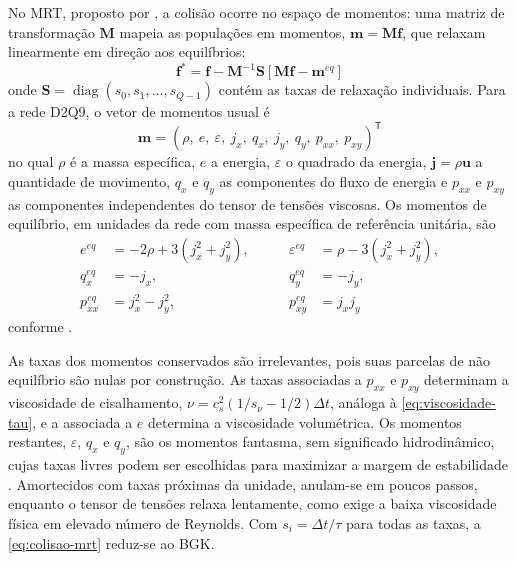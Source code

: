 No MRT, proposto por \textcite{dHumieres1992}, a colisão ocorre no espaço de momentos: uma matriz de transformação $\mathbf{M}$ mapeia as populações em momentos, $\mathbf{m} = \mathbf{M}\mathbf{f}$, que relaxam linearmente em direção aos equilíbrios:
\begin{equation}\label{eq:colisao-mrt}
    \mathbf{f}^* = \mathbf{f} - \mathbf{M}^{-1}\mathbf{S}[\mathbf{M}\mathbf{f} - \mathbf{m}^{eq}]
\end{equation}
onde $\mathbf{S} = \operatorname{diag}(s_0, s_1, \ldots, s_{Q-1})$ contém as taxas de relaxação individuais.
Para a rede D2Q9, o vetor de momentos usual é
\begin{equation}\label{eq:momentos-d2q9}
    \mathbf{m} = \left( \rho,\ e,\ \varepsilon,\ j_x,\ q_x,\ j_y,\ q_y,\ p_{xx},\ p_{xy} \right)^{\mathsf{T}}
\end{equation}
no qual $\rho$ é a massa específica, $e$ a energia, $\varepsilon$ o quadrado da energia, $\mathbf{j} = \rho \mathbf{u}$ a quantidade de movimento, $q_x$ e $q_y$ as componentes do fluxo de energia e $p_{xx}$ e $p_{xy}$ as componentes independentes do tensor de tensões viscosas.
Os momentos de equilíbrio, em unidades da rede com massa específica de referência unitária, são
\begin{equation}\label{eq:momentos-equilibrio-d2q9}
    \begin{aligned}
        e^{eq} &= -2\rho + 3 \left( j_x^2 + j_y^2 \right), &\qquad \varepsilon^{eq} &= \rho - 3 \left( j_x^2 + j_y^2 \right), \\
        q_x^{eq} &= -j_x, &\qquad q_y^{eq} &= -j_y, \\
        p_{xx}^{eq} &= j_x^2 - j_y^2, &\qquad p_{xy}^{eq} &= j_x j_y
    \end{aligned}
\end{equation}
conforme \textcite{Lallemand2000}.

As taxas dos momentos conservados são irrelevantes, pois suas parcelas de não equilíbrio são nulas por construção.
As taxas associadas a $p_{xx}$ e $p_{xy}$ determinam a viscosidade de cisalhamento, $\nu = c_s^2 (1/s_\nu - 1/2) \Delta t$, análoga à \eqref{eq:viscosidade-tau}, e a associada a $e$ determina a viscosidade volumétrica.
Os momentos restantes, $\varepsilon$, $q_x$ e $q_y$, são os momentos fantasma, sem significado hidrodinâmico, cujas taxas livres podem ser escolhidas para maximizar a margem de estabilidade \parencite{Lallemand2000}.
Amortecidos com taxas próximas da unidade, anulam-se em poucos passos, enquanto o tensor de tensões relaxa lentamente, como exige a baixa viscosidade física em elevado número de Reynolds.
Com $s_i = \Delta t/\tau$ para todas as taxas, a \eqref{eq:colisao-mrt} reduz-se ao BGK.


